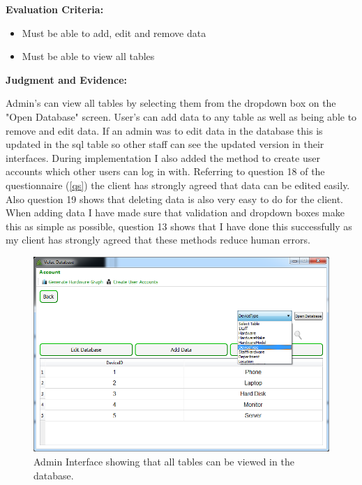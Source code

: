 \textbf{Evaluation Criteria:}
\begin{itemize}
\item{Must be able to add, edit and remove data}
\item{Must be able to view all tables}
\end{itemize}

\textbf{Judgment and Evidence:}

Admin's can view all tables by selecting them from the dropdown box on the "Open Database" screen. User's can add data to any table as well as being able to remove and edit data. If an admin was to edit data in the database this is updated in the sql table so other staff can see the updated version in their interfaces. During implementation I also added the method to create user accounts which other users can log in with. Referring to question 18 of the questionnaire (\ref{qs}) the client has strongly agreed that data can be edited easily. Also question 19 shows that deleting data is also very easy to do for the client. When adding data I have made sure that validation and dropdown boxes make this as simple as possible, question 13 shows that I have done this successfully as my client has strongly agreed that these methods reduce human errors.

\begin{figure}[H]
    \includegraphics[width=\textwidth]{./Evaluation/Images/admin1.png}
    \caption{Admin Interface showing that all tables can be viewed in the database.} 
\end{figure}

